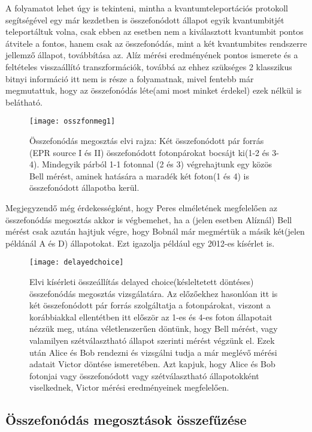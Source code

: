 A folyamatot lehet úgy is tekinteni, mintha a kvantumteleportációs protokoll\cite{bennett1993teleporting} segítségével egy már kezdetben is összefonódott állapot egyik kvantumbitjét teleportáltuk volna, csak ebben az esetben nem a kiválasztott kvantumbit pontos átvitele a fontos, hanem csak az összefonódás, mint a két kvantumbites rendszerre jellemző állapot, továbbítása az. Alíz mérési eredményének pontos ismerete és a feltételes visszaállító transzformációk, továbbá az ehhez szükséges 2 klasszikus bitnyi információ itt nem is része  a folyamatnak, mivel fentebb már megmutattuk, hogy az összefonódás léte(ami most minket érdekel) ezek nélkül is belátható.
\\
\begin{figure}[H]
\centering
\texttt{[image: osszfonmeg1]}
\caption[Összefonódás megosztás elvi rajza]{Összefonódás megosztás elvi rajza: Két összefonódott pár forrás (EPR source I és II) összefonódott fotonpárokat bocsájt ki(1-2 és 3-4). Mindegyik párból 1-1 fotonnal (2 és 3) végrehajtunk egy közös Bell mérést, aminek hatására a maradék két foton(1 és 4) is összefonódott állapotba kerül.}
\end{figure}
Megjegyzendő még érdekességként, hogy Peres elméletének megfelelően\cite{peres2000delayed} az összefonódás megosztás akkor is végbemehet, ha a (jelen esetben Alíznál) Bell mérést csak azután hajtjuk végre, hogy Bobnál már megmértük a másik két(jelen példánál A és D) állapotokat. Ezt igazolja például egy 2012-es kísérlet is\cite{ma2012experimental}.
\\
\begin{figure}[H]
\centering
\texttt{[image: delayedchoice]}
\caption[Késleltetett összefonódás megosztás kísérlet]{Elvi kísérleti összeállítás delayed choice(késleltetett döntéses) összefonódás megosztás vizsgálatára. Az előzőekhez hasonlóan itt is két összefonódott pár forrás szolgáltatja a fotonpárokat, viszont a korábbiakkal ellentétben itt először az 1-es és 4-es foton állapotait nézzük meg, utána véletlenszerűen döntünk, hogy Bell mérést, vagy valamilyen szétválasztható állapot szerinti mérést végzünk el. Ezek után Alice és Bob rendezni és vizsgálni tudja a már meglévő mérési adatait Victor döntése ismeretében. Azt kapjuk, hogy Alice és Bob fotonjai vagy összefonódott vagy szétválasztható állapotokként viselkednek, Victor mérési eredményeinek megfelelően.}
\end{figure}

\subsection{Összefonódás megosztások összefűzése}

